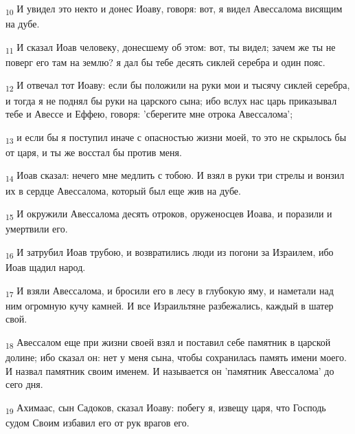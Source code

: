\begin{tcolorbox}
\textsubscript{10} И увидел это некто и донес Иоаву, говоря: вот, я видел Авессалома висящим на дубе.
\end{tcolorbox}
\begin{tcolorbox}
\textsubscript{11} И сказал Иоав человеку, донесшему об этом: вот, ты видел; зачем же ты не поверг его там на землю? я дал бы тебе десять сиклей серебра и один пояс.
\end{tcolorbox}
\begin{tcolorbox}
\textsubscript{12} И отвечал тот Иоаву: если бы положили на руки мои и тысячу сиклей серебра, и тогда я не поднял бы руки на царского сына; ибо вслух нас царь приказывал тебе и Авессе и Еффею, говоря: 'сберегите мне отрока Авессалома';
\end{tcolorbox}
\begin{tcolorbox}
\textsubscript{13} и если бы я поступил иначе с опасностью жизни моей, то это не скрылось бы от царя, и ты же восстал бы против меня.
\end{tcolorbox}
\begin{tcolorbox}
\textsubscript{14} Иоав сказал: нечего мне медлить с тобою. И взял в руки три стрелы и вонзил их в сердце Авессалома, который был еще жив на дубе.
\end{tcolorbox}
\begin{tcolorbox}
\textsubscript{15} И окружили Авессалома десять отроков, оруженосцев Иоава, и поразили и умертвили его.
\end{tcolorbox}
\begin{tcolorbox}
\textsubscript{16} И затрубил Иоав трубою, и возвратились люди из погони за Израилем, ибо Иоав щадил народ.
\end{tcolorbox}
\begin{tcolorbox}
\textsubscript{17} И взяли Авессалома, и бросили его в лесу в глубокую яму, и наметали над ним огромную кучу камней. И все Израильтяне разбежались, каждый в шатер свой.
\end{tcolorbox}
\begin{tcolorbox}
\textsubscript{18} Авессалом еще при жизни своей взял и поставил себе памятник в царской долине; ибо сказал он: нет у меня сына, чтобы сохранилась память имени моего. И назвал памятник своим именем. И называется он 'памятник Авессалома' до сего дня.
\end{tcolorbox}
\begin{tcolorbox}
\textsubscript{19} Ахимаас, сын Садоков, сказал Иоаву: побегу я, извещу царя, что Господь судом Своим избавил его от рук врагов его.
\end{tcolorbox}
